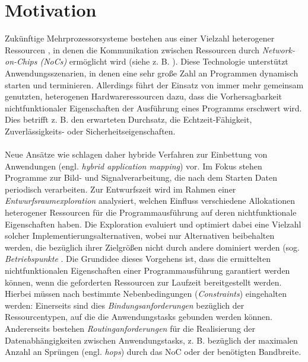 \chapter{Motivation}\label{motivation}
Zukünftige Mehrprozessorsysteme bestehen aus einer Vielzahl heterogener
Ressourcen \cite{thousandCoreChips}, in denen die Kommunikation zwischen Ressourcen
durch \textit{Network-on-Chips (NoCs)} ermöglicht wird (siehe z. B. \cite{mappingNocArchitectures}). Diese Technologie
unterstützt Anwendungsszenarien, in denen eine sehr große Zahl an Programmen
dynamisch starten und terminieren. Allerdings führt der Einsatz von
immer mehr gemeinsam genutzten, heterogenen Hardwareressourcen dazu, dass
die Vorhersagbarkeit nichtfunktionaler Eigenschaften der Ausführung eines Programms
erschwert wird. Dies betrifft z. B. den erwarteten Durchsatz, die Echtzeit-Fähigkeit, Zuverlässigkeits- oder Sicherheitseigenschaften.\\
\\
Neue Ansätze wie \cite{reconfigurableArchtictures} \cite{daarm} schlagen daher hybride Verfahren zur Einbettung von
Anwendungen (engl. \textit{hybrid application mapping}) vor. Im Fokus stehen Programme
zur Bild- und Signalverarbeitung, die nach dem Starten Daten periodisch
verarbeiten. Zur Entwurfszeit wird im Rahmen einer \textit{Entwurfsraumexploration} analysiert, welchen Einfluss verschiedene Allokationen heterogener
Ressourcen für die Programmausführung auf deren nichtfunktionale Eigenschaften
haben. Die Exploration evaluiert und optimiert dabei eine Vielzahl solcher
Implementierungsalternativen, wobei nur Alternativen beibehalten werden, die
bezüglich ihrer Zielgrößen nicht durch andere dominiert werden (sog. \textit{Betriebspunkte} \cite{runTimeManagement}. Die Grundidee dieses Vorgehens ist, dass die ermittelten nichtfunktionalen
Eigenschaften einer Programmausführung garantiert werden können,
wenn die geforderten Ressourcen zur Laufzeit bereitgestellt werden. Hierbei
müssen nach \cite{daarm}  bestimmte Nebenbedingungen (\textit{Constraints}) eingehalten werden:
Einerseits sind dies \textit{Bindungsanforderungen} bezüglich der Ressourcentypen,
auf die die Anwendungstasks gebunden werden können. Andererseits bestehen
\textit{Routinganforderungen} für die Realisierung der Datenabhängigkeiten zwischen
Anwendungstasks, z. B. bezüglich der maximalen Anzahl an Sprüngen (engl.
\textit{hops}) durch das NoC oder der benötigten Bandbreite.\\
\\
